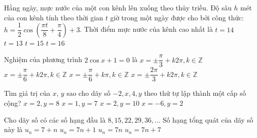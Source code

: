 \begin{ex}%
	Hằng ngày, mực nước của một con kênh lên xuống theo thủy triều. Độ sâu $h$ mét của con
	kênh tính theo thời gian $t$ giờ trong một ngày được cho bởi công thức: $h=\dfrac{1}{2}\cos\left( \dfrac{\pi t}{8}+\dfrac{\pi}{4}\right) +3$. Thời điểm mực nước của kênh cao nhất là
	\choice
	{\True $t=14$}
	{$t=13$}
	{$t=15$}
	{$t=16$}
\end{ex}
\begin{ex}%
	Nghiệm của phương trình $2\cos x+1=0$ là
	\choice
	{$x=\pm\dfrac{\pi}{3}+k2\pi,k\in\mathbb{Z}$}
	{$x=\pm\dfrac{\pi}{6}+k2\pi,k\in\mathbb{Z}$}
	{$x=\pm\dfrac{\pi}{6}+k\pi,k\in\mathbb{Z}$}
	{\True $x=\pm\dfrac{2\pi}{3}+k2\pi,k\in\mathbb{Z}$}
\end{ex}
\begin{ex}%
	Tìm giá trị của $x$, $y$ sao cho dãy số $-2, x, 4, y$ theo thứ tự lập thành một cấp số cộng?
	\choice
	{$x=2,y=8$}
	{\True $x=1,y=7$}
	{$x=2,y=10$}
	{$x=-6,y=2$}
\end{ex}
\begin{ex}%
	Cho dãy số có các số hạng đầu là $8, 15, 22, 29, 36,\dotsc$ Số hạng tổng quát của dãy số này là
	\choice
	{$u_n=7+n$}
	{\True $u_n=7n+1$}
	{$u_n=7n$}
	{$u_n=7n+7$}
\end{ex}
